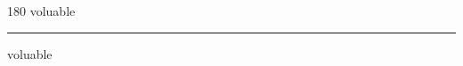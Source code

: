 
\begin{frame}
\begin{center}
\begin{turn}{180}
{\fontsize{2.5cm}{1em}\selectfont voluable}
\end{turn}
\vspace{1em}\par  
\hrule
\vspace{1em}\par  
{\fontsize{2.5cm}{1em}\selectfont voluable}
\end{center}
\end{frame}
